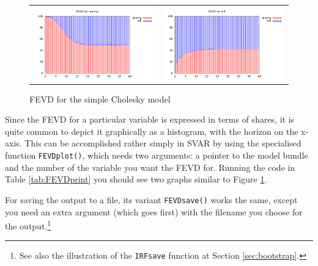 \documentclass[a4paper,10pt]{article}
\newcommand{\cmd}[1]{\texttt{#1}}
\newlength{\irfw}
\newlength{\irfh}
\begin{document}
\begin{figure}[htbp]
  \centering
  \begin{tabular}{cc}
    \includegraphics[width=\irfw, height=\irfh]{FEVD_1} &
    \includegraphics[width=\irfw, height=\irfh]{FEVD_2}
  \end{tabular}
  \caption{FEVD for the simple Cholesky model}
  \label{fig:FEVDplot}
\end{figure}

Since the FEVD for a particular variable is expressed in terms of
shares, it is quite common to depict it graphically as a histogram,
with the horizon on the x-axis. This can be accomplished rather simply
in SVAR by using the specialised function \cmd{FEVDplot()}, which
needs two arguments: a pointer to the model bundle and the number of
the variable you want the FEVD for. Running the code in Table
\ref{tab:FEVDprint} you should see two graphs similar to Figure
\ref{fig:FEVDplot}.

For saving the output to a file, its variant \cmd{FEVDsave()} works
the same, except you need an extra argument (which goes first) with
the filename you choose for the output.\footnote{See also the
  illustration of the \cmd{IRFsave} function at Section
  \ref{sec:bootstrap}.}
\end{document}
